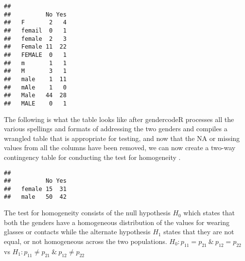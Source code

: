 \documentclass[
]{article}
\newenvironment{Shaded}{\begin{snugshade}}{\end{snugshade}}
\newcommand{\CommentTok}[1]{\textcolor[rgb]{0.56,0.35,0.01}{\textit{#1}}}
\newcommand{\DataTypeTok}[1]{\textcolor[rgb]{0.13,0.29,0.53}{#1}}
\newcommand{\KeywordTok}[1]{\textcolor[rgb]{0.13,0.29,0.53}{\textbf{#1}}}
\newcommand{\NormalTok}[1]{#1}
\newcommand{\OperatorTok}[1]{\textcolor[rgb]{0.81,0.36,0.00}{\textbf{#1}}}
\newcommand{\StringTok}[1]{\textcolor[rgb]{0.31,0.60,0.02}{#1}}
\begin{document}
\begin{Shaded}
\end{Shaded}

\begin{verbatim}
##         
##          No Yes
##   F       2   4
##   femail  0   1
##   female  2   3
##   Female 11  22
##   FEMALE  0   1
##   m       1   1
##   M       3   1
##   male    1  11
##   mAle    1   0
##   Male   44  28
##   MALE    0   1
\end{verbatim}

\begin{Shaded}
\end{Shaded}

The following is what the table looks like after gendercodeR processes
all the various spellings and formats of addressing the two genders and
compiles a wrangled table that is appropriate for testing, and now that
the NA or missing values from all the columns have been removed, we can
now create a two-way contingency table for conducting the test for
homogeneity .

\begin{Shaded}
\end{Shaded}

\begin{verbatim}
##         
##          No Yes
##   female 15  31
##   male   50  42
\end{verbatim}

The test for homogeneity consists of the null hypothesis \(H_0\) which
states that both the genders have a homogeneous distribution of the
values for wearing glasses or contacts while the alternate hypothesis
\(H_1\) states that they are not equal, or not homogeneous across the
two populations. \(H_0: p_{11} = p_{21} \ \& \ p_{12} = p_{22}\) vs
\(H_1: p_{11} \neq p_{21} \ \& \ p_{12} \neq p_{22}\)
\end{document}

